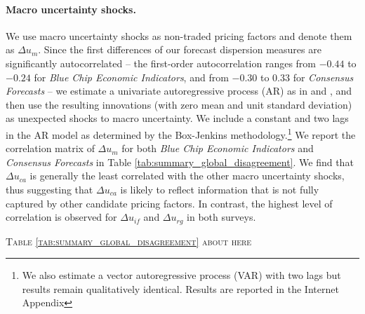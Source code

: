 \paragraph{Macro uncertainty shocks.}
We use macro uncertainty shocks as non-traded pricing factors and denote them as $\Delta u_{m}$. Since the first differences of our forecast dispersion measures are significantly autocorrelated -- the first-order autocorrelation ranges from $-0.44$ to $-0.24$ for \emph{Blue Chip Economic Indicators}, and from $-0.30$ to $0.33$ for \emph{Consensus Forecasts} -- we estimate a univariate autoregressive process (AR) as in \citet{mancini_etal2013} and \citet{menkhoff_etal2012}, and then use the resulting innovations (with zero mean and unit standard deviation) as unexpected shocks to macro uncertainty. %
We include a constant and two lags in the AR model as determined by the Box-Jenkins methodology.\footnote{We also estimate a vector autoregressive process (VAR) with two lags but results remain qualitatively identical. Results are reported in the Internet Appendix} We report the correlation matrix of $\Delta u_{m}$ for both \emph{Blue Chip Economic Indicators} and \emph{Consensus Forecasts} in Table \ref{tab:summary_global_disagreement}. We find that $\Delta u_{ca}$ is generally the least correlated with the other macro uncertainty shocks, thus suggesting that $\Delta u_{ca}$ is likely to reflect information that is not fully captured by other candidate pricing factors. In contrast, the highest level of correlation is observed for $\Delta u_{if}$ and $\Delta u_{rg}$ in both surveys.

\begin{center}
	\textsc{Table \ref{tab:summary_global_disagreement} about here}
\end{center}

